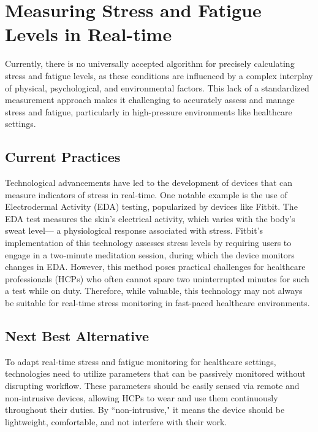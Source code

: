 \section{Measuring Stress and Fatigue Levels in Real-time}
Currently, there is no universally accepted algorithm for precisely calculating stress and fatigue levels, as these conditions are influenced by a complex interplay of physical, psychological, and environmental factors. This lack of a standardized measurement approach makes it challenging to accurately assess and manage stress and fatigue, particularly in high-pressure environments like healthcare settings.


\subsection{Current Practices}
Technological advancements have led to the development of devices that can measure indicators of stress in real-time. One notable example is the use of Electrodermal Activity (EDA) testing, popularized by devices like Fitbit. The EDA test measures the skin's electrical activity, which varies with the body’s sweat level— a physiological response associated with stress. Fitbit's implementation of this technology assesses stress levels by requiring users to engage in a two-minute meditation session, during which the device monitors changes in EDA. \cite{49} However, this method poses practical challenges for healthcare professionals (HCPs) who often cannot spare two uninterrupted minutes for such a test while on duty. Therefore, while valuable, this technology may not always be suitable for real-time stress monitoring in fast-paced healthcare environments.


\subsection{Next Best Alternative}
To adapt real-time stress and fatigue monitoring for healthcare settings, technologies need to utilize parameters that can be passively monitored without disrupting workflow. These parameters should be easily sensed via remote and non-intrusive devices, allowing HCPs to wear and use them continuously throughout their duties. By ``non-intrusive," it means the device should be lightweight, comfortable, and not interfere with their work. \\

